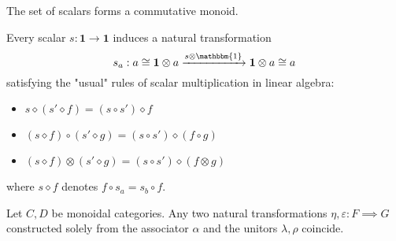 	\begin{property}
		The set of scalars forms a commutative monoid.
	\end{property}
	\begin{property}
		Every scalar $s:\mathbf{1}\rightarrow\mathbf{1}$ induces a natural transformation \[s_a:a\cong\mathbf{1}\otimes a\xrightarrow{s\otimes\mathbbm{1}}\mathbf{1}\otimes a\cong a\] satisfying the "usual" rules of scalar multiplication in linear algebra:
		\begin{itemize}
			\item $s\diamond(s'\diamond f) = (s\circ s')\diamond f$
			\item $(s\diamond f)\circ(s'\diamond g) = (s\circ s')\diamond(f\circ g)$
			\item $(s\diamond f)\otimes(s'\diamond g) = (s\circ s')\diamond(f\otimes g)$
		\end{itemize}
		where $s\diamond f$ denotes $f\circ s_a = s_b\circ f$.
	\end{property}
	
	
	\begin{theorem}
		Let $C, D$ be monoidal categories. Any two natural transformations $\eta, \varepsilon:F\implies G$ constructed solely from the associator $\alpha$ and the unitors $\lambda,\rho$ coincide.
	\end{theorem}
	
